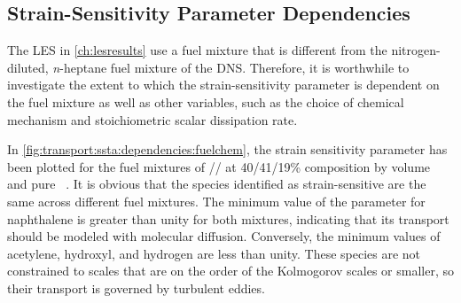 \subsection{Strain-Sensitivity Parameter Dependencies}
\label{sec:transport:ssta:dependencies}

The LES in \cref{ch:lesresults} use a fuel mixture that is different from the nitrogen-diluted, \textit{n}-heptane fuel mixture of the DNS. Therefore, it is worthwhile to investigate the extent to which the strain-sensitivity parameter is dependent on the fuel mixture as well as other variables, such as the choice of chemical mechanism and stoichiometric scalar dissipation rate.

In \cref{fig:transport:ssta:dependencies:fuelchem}, the strain sensitivity parameter has been plotted for the fuel mixtures of // at 40/41/19\% composition by volume~\cite{mahmoud2017} and pure ~\cite{shaddix2010,zhang2011}. It is obvious that the species identified as strain-sensitive are the same across different fuel mixtures. The minimum value of the parameter for naphthalene is greater than unity for both mixtures, indicating that its transport should be modeled with molecular diffusion. Conversely, the minimum values of acetylene, hydroxyl, and hydrogen are less than unity. These species are not constrained to scales that are on the order of the Kolmogorov scales or smaller, so their transport is governed by turbulent eddies.

